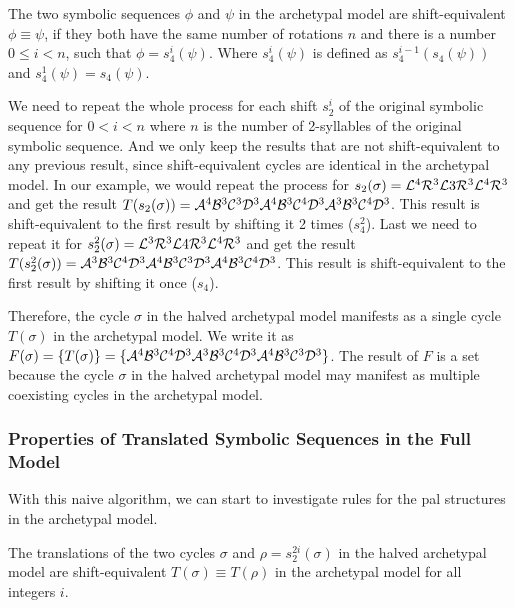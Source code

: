 \begin{definition}
	The two symbolic sequences $\phi$ and $\psi$ in the archetypal model are shift-equivalent $\phi \equiv \psi$,
	if they both have the same number of rotations $n$
	and there is a number $0 \leq i < n$, such that $\phi = s_4^i(\psi)$.
	Where $s_4^i(\psi)$ is defined as $s_4^{i-1}(s_4(\psi))$ and $s_4^1(\psi) = s_4(\psi)$.
\end{definition}

We need to repeat the whole process for each shift $s_2^i$ of the original symbolic sequence for $0 < i < n$ where $n$ is the number of 2-syllables of the original symbolic sequence.
And we only keep the results that are not shift-equivalent to any previous result, since shift-equivalent cycles are identical in the archetypal model.
In our example, we would repeat the process for $s_2(\sigma) = \mathcal{L}^4\mathcal{R}^3\mathcal{L}3\mathcal{R}^3\mathcal{L}^4\mathcal{R}^3$ and get the result $T(s_2(\sigma)) = \mathcal{A}^4\mathcal{B}^3\mathcal{C}^3\mathcal{D}^3\mathcal{A}^4\mathcal{B}^3\mathcal{C}^4\mathcal{D}^3\mathcal{A}^3\mathcal{B}^3\mathcal{C}^4\mathcal{D}^3$.
This result is shift-equivalent to the first result by shifting it 2 times ($s_4^2$).
Last we need to repeat it for $s_2^2(\sigma) = \mathcal{L}^3\mathcal{R}^3\mathcal{L}4\mathcal{R}^3\mathcal{L}^4\mathcal{R}^3$ and get the result $T(s_2^2(\sigma)) = \mathcal{A}^3\mathcal{B}^3\mathcal{C}^4\mathcal{D}^3\mathcal{A}^4\mathcal{B}^3\mathcal{C}^3\mathcal{D}^3\mathcal{A}^4\mathcal{B}^3\mathcal{C}^4\mathcal{D}^3$.
This result is shift-equivalent to the first result by shifting it once ($s_4$).

Therefore, the cycle $\sigma$ in the halved archetypal model manifests as a single cycle $T(\sigma)$ in the archetypal model.
We write it as $F(\sigma) = \{T(\sigma)\} = \{\mathcal{A}^4\mathcal{B}^3\mathcal{C}^4\mathcal{D}^3\mathcal{A}^3\mathcal{B}^3\mathcal{C}^4\mathcal{D}^3\mathcal{A}^4\mathcal{B}^3\mathcal{C}^3\mathcal{D}^3\}$.
The result of $F$ is a set because the cycle $\sigma$ in the halved archetypal model may manifest as multiple coexisting cycles in the archetypal model.

\subsubsection{Properties of Translated Symbolic Sequences in the Full Model}

With this naive algorithm, we can start to investigate rules for the \gls{pal} structures in the archetypal model.

\begin{lemma}
	\label{lemma:equivalence.translations}
	The translations of the two cycles $\sigma$ and $\rho = s_2^{2i}(\sigma)$ in the halved archetypal model are shift-equivalent $T(\sigma) \equiv T(\rho)$ in the archetypal model for all integers $i$.
\end{lemma}

